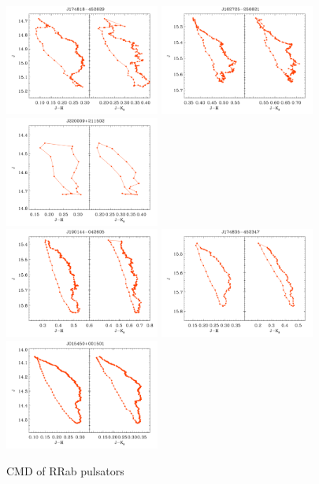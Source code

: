 \documentclass[]{emulateapj}
\begin{document}
\begin{figure}[]
\centering
\includegraphics[width=2.0in]{new_plots/rr_cmd_2}
\includegraphics[width=2.0in]{new_plots/rr_cmd_3}
\includegraphics[width=2.0in]{new_plots/rr_cmd_4}\\
\includegraphics[width=2.0in]{new_plots/rr_cmd_5}
\includegraphics[width=2.0in]{new_plots/rr_cmd_6}
\includegraphics[width=2.0in]{new_plots/rr_cmd_7}
\caption{CMD of RRab pulsators}
\label{cmdshort}
\end{figure}
\end{document}
